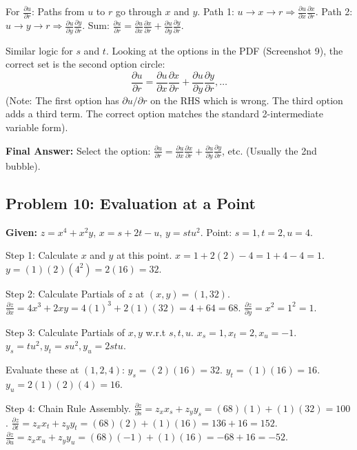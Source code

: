 \documentclass[11pt, letterpaper]{article}
\theoremstyle{definition}
\begin{document}
For $\frac{\partial u}{\partial r}$:
Paths from $u$ to $r$ go through $x$ and $y$.
Path 1: $u \to x \to r \Rightarrow \frac{\partial u}{\partial x}\frac{\partial x}{\partial r}$.
Path 2: $u \to y \to r \Rightarrow \frac{\partial u}{\partial y}\frac{\partial y}{\partial r}$.
Sum: $\frac{\partial u}{\partial r} = \frac{\partial u}{\partial x}\frac{\partial x}{\partial r} + \frac{\partial u}{\partial y}\frac{\partial y}{\partial r}$.

Similar logic for $s$ and $t$.
Looking at the options in the PDF (Screenshot 9), the correct set is the second option circle:
\[ \frac{\partial u}{\partial r} = \frac{\partial u}{\partial x}\frac{\partial x}{\partial r} + \frac{\partial u}{\partial y}\frac{\partial y}{\partial r}, \dots \]
(Note: The first option has $\partial u/\partial r$ on the RHS which is wrong. The third option adds a third term. The correct option matches the standard 2-intermediate variable form).

\textbf{Final Answer:} Select the option:
$\frac{\partial u}{\partial r} = \frac{\partial u}{\partial x}\frac{\partial x}{\partial r} + \frac{\partial u}{\partial y}\frac{\partial y}{\partial r}$, etc. (Usually the 2nd bubble).


\subsection*{Problem 10: Evaluation at a Point}
\textbf{Given:} $z = x^4 + x^2y$, $x = s + 2t - u$, $y = stu^2$.
Point: $s=1, t=2, u=4$.

Step 1: Calculate $x$ and $y$ at this point.
$x = 1 + 2(2) - 4 = 1 + 4 - 4 = 1$.
$y = (1)(2)(4^2) = 2(16) = 32$.

Step 2: Calculate Partials of $z$ at $(x,y)=(1,32)$.
$\frac{\partial z}{\partial x} = 4x^3 + 2xy = 4(1)^3 + 2(1)(32) = 4 + 64 = 68$.
$\frac{\partial z}{\partial y} = x^2 = 1^2 = 1$.

Step 3: Calculate Partials of $x, y$ w.r.t $s, t, u$.
$x_s=1, x_t=2, x_u=-1$.
$y_s=tu^2, y_t=su^2, y_u=2stu$.

Evaluate these at $(1,2,4)$:
$y_s = (2)(16) = 32$.
$y_t = (1)(16) = 16$.
$y_u = 2(1)(2)(4) = 16$.

Step 4: Chain Rule Assembly.
$\frac{\partial z}{\partial s} = z_x x_s + z_y y_s = (68)(1) + (1)(32) = 100$.
$\frac{\partial z}{\partial t} = z_x x_t + z_y y_t = (68)(2) + (1)(16) = 136 + 16 = 152$.
$\frac{\partial z}{\partial u} = z_x x_u + z_y y_u = (68)(-1) + (1)(16) = -68 + 16 = -52$.
\end{document}
